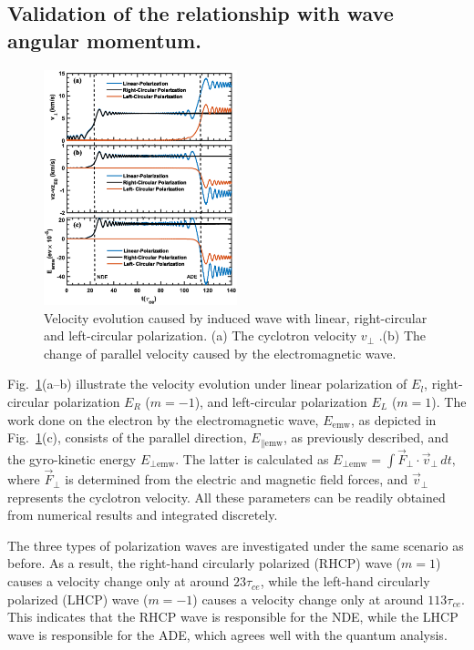 \documentclass{cpbtex3}
\begin{document}
\subsection{Validation of the relationship with wave angular momentum. }
\begin{figure}[ht]
\centering
\includegraphics[width=0.5\textwidth]{Figure6.eps}%
\caption{Velocity evolution caused by induced wave with linear, right-circular and left-circular polarization. (a) The cyclotron velocity $v_\perp$ .(b) The change of parallel velocity caused by the electromagnetic wave.}
    \label{fig:AngularMomentum}
\end{figure}

Fig.~\ref{fig:AngularMomentum}(a--b) illustrate the velocity evolution under linear polarization of \( E_l \), right-circular polarization \( E_R \) (\( m = -1 \)), and left-circular polarization \( E_L \) (\( m = 1 \)). The work done on the electron by the electromagnetic wave, \( E_{\text{emw}} \), as depicted in Fig.~\ref{fig:AngularMomentum}(c), consists of the parallel direction, \( E_{\parallel\text{emw}} \), as previously described, and the gyro-kinetic energy \( E_{\perp\text{emw}} \). The latter is calculated as
\(
E_{\perp\text{emw}} = \int \vec{F}_{\perp} \cdot \vec{v}_{\perp} \, dt,
\)
where \( \vec{F}_{\perp} \) is determined from the electric and magnetic field forces, and \( \vec{v}_{\perp} \) represents the cyclotron velocity. All these parameters can be readily obtained from numerical results and integrated discretely.

The three types of polarization waves are investigated under the same scenario as before. As a result, the right-hand circularly polarized (RHCP) wave (\( m = 1 \)) causes a velocity change only at around \( 23\tau_{ce} \), while the left-hand circularly polarized (LHCP) wave (\( m = -1 \)) causes a velocity change only at around \( 113\tau_{ce} \). This indicates that the RHCP wave is responsible for the NDE, while the LHCP wave is responsible for the ADE, which agrees well with the quantum analysis.
\end{document}
